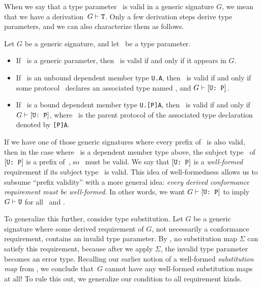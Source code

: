 \documentclass[../generics]{subfiles}
\begin{document}
When we say that a type parameter \tT\ is valid in a generic signature $G$, we mean that we have a derivation~$G\vdash\texttt{T}$. Only a few derivation steps derive type parameters, and we can also characterize them as follows.

\begin{proposition}\label{valid type param alt}
Let $G$ be a generic signature, and let \tT\ be a type parameter.
\begin{itemize}
\item If \tT\ is a generic parameter, then \tT\ is valid if and only if it appears in $G$.
\item If \tT\ is an unbound dependent member type \texttt{U.A}, then \tT\ is valid if and only if some protocol \tP\ declares an associated type named \nA, and $G\vdash[\texttt{U:~P}]$.
\item If \tT\ is a bound dependent member type \texttt{U.[P]A}, then \tT\ is valid if and only if $G\vdash[\texttt{U:~P}]$, where \tP\ is the parent protocol of the associated type declaration denoted by \texttt{[P]A}.
\end{itemize}
\end{proposition}

If we have one of those generic signatures where every prefix of \tT\ is also valid, then in the case where \tT\ is a dependent member type above, the subject type \tU\ of $[\texttt{U:~P}]$ is a prefix of~\tT, so \tU\ must be valid. We say that $[\texttt{U:~P}]$ is a \emph{well-formed} requirement if its subject type \tU\ is valid. This idea of well-formedness allows us to subsume ``prefix validity'' with a more general idea: \textsl{every derived conformance requirement must be well-formed}. In other words, we want $G\vdash[\texttt{U:~P}]$ to imply $G\vdash\texttt{U}$ for all \tU\ and \tP.

To generalize this further, consider type substitution. Let $G$ be a generic signature where some derived requirement of $G$, not necessarily a conformance requirement, contains an invalid type parameter. By , no substitution map $\Sigma$ can satisfy this requirement, because after we apply $\Sigma$, the invalid type parameter becomes an error type. Recalling our earlier notion of a well-formed \emph{substitution map} from , we conclude that~$G$ cannot have any well-formed substitution maps at all! To rule this out, we generalize our condition to all requirement kinds.
\end{document}
